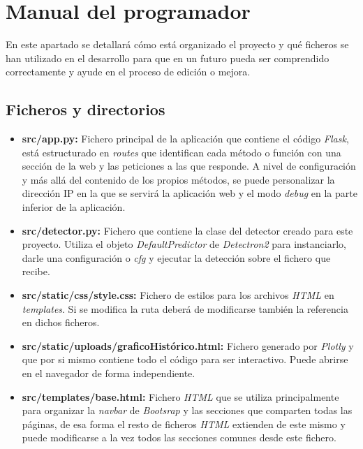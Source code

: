 \section{Manual del programador}
En este apartado se detallará cómo está organizado el proyecto y qué ficheros se han utilizado en el desarrollo para que en un futuro pueda ser comprendido correctamente y ayude en el proceso de edición o mejora.

\subsection{Ficheros y directorios}

\begin{itemize}
    \item \textbf{src/app.py:} Fichero principal de la aplicación que contiene el código \emph{Flask}, está estructurado en \emph{routes} que identifican cada método o función con una sección de la web y las peticiones a las que responde.
    A nivel de configuración y más allá del contenido de los propios métodos, se puede personalizar la dirección IP en la que se servirá la aplicación web y el modo \emph{debug} en la parte inferior de la aplicación. 
    
    \item \textbf{src/detector.py:} Fichero que contiene la clase del detector creado para este proyecto. Utiliza el objeto \emph{DefaultPredictor} de \emph{Detectron2} para instanciarlo, darle una configuración o \emph{cfg} y ejecutar la detección sobre el fichero que recibe.
    
    \item \textbf{src/static/css/style.css:} Fichero de estilos para los archivos \emph{HTML} en \emph{templates}. Si se modifica la ruta deberá de modificarse también la referencia en dichos ficheros.
    
    \item \textbf{src/static/uploads/graficoHistórico.html:} Fichero generado por \emph{Plotly} y que por si mismo contiene todo el código para ser interactivo. Puede abrirse en el navegador de forma independiente.
    
    \item \textbf{src/templates/base.html:} Fichero \emph{HTML} que se utiliza principalmente para organizar la \emph{navbar} de \emph{Bootsrap} y las secciones que comparten todas las páginas, de esa forma el resto de ficheros \emph{HTML} extienden de este mismo y puede modificarse a la vez todos las secciones comunes desde este fichero.
    

\end{itemize}
